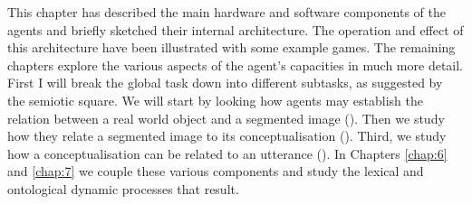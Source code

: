 This chapter has described the main hardware 
and software components of the agents and briefly sketched
their internal architecture. The operation and effect
of this architecture have been 
illustrated with some example games. The remaining chapters explore the 
various aspects of the agent's capacities in much more detail. 
First I will break the global task down into different subtasks, 
as suggested by the semiotic square. We will start by looking how agents 
may establish the relation between a real world object and 
a segmented image (). Then we study how they 
relate a segmented image to its conceptualisation (). 
Third, we study how a conceptualisation can be related to 
an utterance (). In Chapters \ref{chap:6} and \ref{chap:7} we couple these
various components and study the lexical and ontological 
dynamic processes that result. 

%

